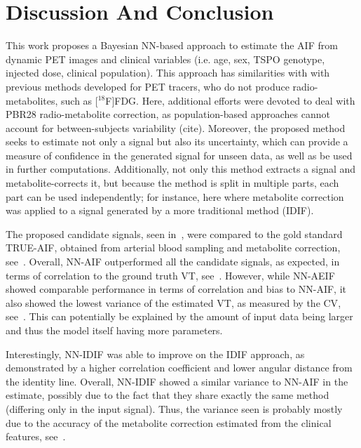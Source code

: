 \vspace{-0.5cm}

\section{Discussion And Conclusion} \label{sec:discussion}
    This work proposes a Bayesian \gls{NN}-based approach to estimate the \gls{AIF} from dynamic \gls{PET} images and clinical variables (i.e. age, sex, \gls{TSPO} genotype, injected dose, clinical population). This approach has similarities with with previous methods developed for \gls{PET} tracers, who do not produce radio-metabolites, such as [$^{18}$F]\gls{FDG}. Here, additional efforts were devoted to deal with \gls{PBR28} radio-metabolite correction, as population-based approaches cannot account for between-subjects variability (cite). Moreover, the proposed method seeks to estimate not only a signal but also its uncertainty, which can provide a measure of confidence in the generated signal for unseen data, as well as be used in further computations. Additionally, not only this method extracts a signal and metabolite-corrects it, but because the method is split in multiple parts, each part can be used independently; for instance, here where metabolite correction was applied to a signal generated by a more traditional method (\gls{IDIF}).

    The proposed candidate signals, seen in~, were compared to the gold standard TRUE-\gls{AIF}, obtained from arterial blood sampling and metabolite correction, see~. Overall, \gls{NN}-\gls{AIF} outperformed all the candidate signals, as expected, in terms of correlation to the ground truth \gls{VT}, see~. However, while \gls{NN}-\gls{AE}\gls{IF} showed comparable performance in terms of correlation and bias to \gls{NN}-\gls{AIF}, it also showed the lowest variance of the estimated \gls{VT}, as measured by the \gls{CV}, see~. This can potentially be explained by the amount of input data being larger and thus the model itself having more parameters.
    
    Interestingly, \gls{NN}-\gls{IDIF} was able to improve on the \gls{IDIF} approach, as demonstrated by a higher correlation coefficient and lower angular distance from the identity line. Overall, \gls{NN}-\gls{IDIF} showed a similar variance to \gls{NN}-\gls{AIF} in the estimate, possibly due to the fact that they share exactly the same method (differing only in the input signal). Thus, the variance seen is probably mostly due to the accuracy of the metabolite correction estimated from the clinical features, see~.
    
